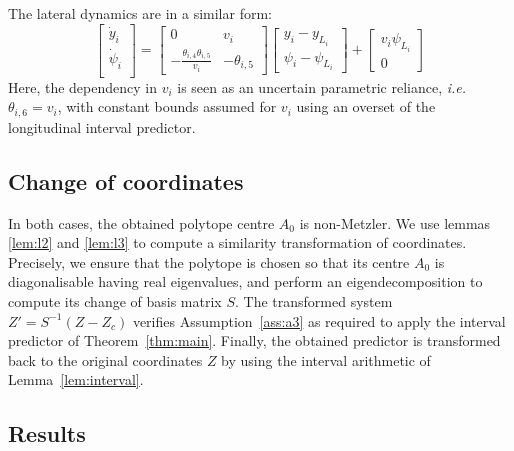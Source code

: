 \documentclass[letterpaper, 10 pt, conference]{ieeeconf}
\theoremstyle{plain}
\theoremstyle{definition}
\theoremstyle{plain}
\theoremstyle{plain}
\theoremstyle{remark}
\begin{document}
The lateral dynamics are in a similar form:
\begin{equation*}
\begin{bmatrix}
\dot{y}_i \\
\dot{\psi}_i \\
\end{bmatrix}
=
\begin{bmatrix}
0 & v_i \\
-\frac{\theta_{i,4} \theta_{i,5}}{v_i} & -\theta_{i,5}
\end{bmatrix}
\begin{bmatrix}
y_i - y_{L_i} \\
\psi_i - \psi_{L_i}
\end{bmatrix}
+
\begin{bmatrix}
v_i\psi_{L_i} \\
0
\end{bmatrix}
\end{equation*}
Here, the dependency in $v_i$ is seen as an uncertain parametric reliance, \emph{i.e.} $\theta_{i,6}=v_i$, with constant bounds assumed for $v_i$ using an overset of the longitudinal interval predictor.

\subsection{Change of coordinates}
In both cases, the obtained polytope centre $A_0$ is non-Metzler.
We use lemmas \ref{lem:l2} and \ref{lem:l3} to compute a similarity transformation of coordinates. Precisely, we ensure that the polytope is chosen so that its centre $A_0$ is diagonalisable having real eigenvalues, and perform an eigendecomposition to compute its change of basis matrix $S$. The transformed system $Z'=S^{-1}(Z-Z_c)$ verifies Assumption~\ref{ass:a3} as required to apply the interval predictor of Theorem~\ref{thm:main}. Finally, the obtained predictor is transformed back to the original coordinates $Z$ by using the interval arithmetic of Lemma~\ref{lem:interval}.

\subsection{Results}
\end{document}
